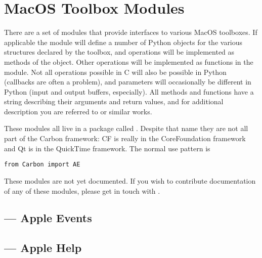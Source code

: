 \chapter{MacOS Toolbox Modules \label{toolbox}}

There are a set of modules that provide interfaces to various MacOS
toolboxes.  If applicable the module will define a number of Python
objects for the various structures declared by the toolbox, and
operations will be implemented as methods of the object.  Other
operations will be implemented as functions in the module.  Not all
operations possible in C will also be possible in Python (callbacks
are often a problem), and parameters will occasionally be different in
Python (input and output buffers, especially).  All methods and
functions have a  string describing their arguments
and return values, and for additional description you are referred to
 or similar works.

These modules all live in a package called . Despite that name
they are not all part of the Carbon framework: CF is really in the CoreFoundation
framework and Qt is in the QuickTime framework.
The normal use pattern is

\begin{verbatim}
from Carbon import AE
\end{verbatim}

  These modules are not yet documented.  If you
wish to contribute documentation of any of these modules, please get
in touch with .

\localmoduletable




\section{ --- Apple Events}

\section{ --- Apple Help}


